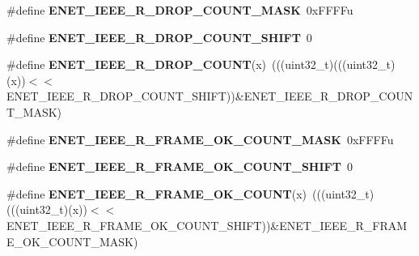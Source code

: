 \begin{DoxyCompactItemize}
\item 
\#define {\bfseries E\+N\+E\+T\+\_\+\+I\+E\+E\+E\+\_\+\+R\+\_\+\+D\+R\+O\+P\+\_\+\+C\+O\+U\+N\+T\+\_\+\+M\+A\+SK}~0x\+F\+F\+F\+Fu\hypertarget{group__ENET__Register__Masks_ga40514ce83587f1cd466ecbe7b007e571}{}\label{group__ENET__Register__Masks_ga40514ce83587f1cd466ecbe7b007e571}

\item 
\#define {\bfseries E\+N\+E\+T\+\_\+\+I\+E\+E\+E\+\_\+\+R\+\_\+\+D\+R\+O\+P\+\_\+\+C\+O\+U\+N\+T\+\_\+\+S\+H\+I\+FT}~0\hypertarget{group__ENET__Register__Masks_gadfe517b4bb1358a8934a04c3bfe94d9d}{}\label{group__ENET__Register__Masks_gadfe517b4bb1358a8934a04c3bfe94d9d}

\item 
\#define {\bfseries E\+N\+E\+T\+\_\+\+I\+E\+E\+E\+\_\+\+R\+\_\+\+D\+R\+O\+P\+\_\+\+C\+O\+U\+NT}(x)~(((uint32\+\_\+t)(((uint32\+\_\+t)(x))$<$$<$E\+N\+E\+T\+\_\+\+I\+E\+E\+E\+\_\+\+R\+\_\+\+D\+R\+O\+P\+\_\+\+C\+O\+U\+N\+T\+\_\+\+S\+H\+I\+FT))\&E\+N\+E\+T\+\_\+\+I\+E\+E\+E\+\_\+\+R\+\_\+\+D\+R\+O\+P\+\_\+\+C\+O\+U\+N\+T\+\_\+\+M\+A\+SK)\hypertarget{group__ENET__Register__Masks_ga949d161e892827ef0d58e6dc6597885b}{}\label{group__ENET__Register__Masks_ga949d161e892827ef0d58e6dc6597885b}

\item 
\#define {\bfseries E\+N\+E\+T\+\_\+\+I\+E\+E\+E\+\_\+\+R\+\_\+\+F\+R\+A\+M\+E\+\_\+\+O\+K\+\_\+\+C\+O\+U\+N\+T\+\_\+\+M\+A\+SK}~0x\+F\+F\+F\+Fu\hypertarget{group__ENET__Register__Masks_ga61cc0d2a38667a1263e2233c7f9a4270}{}\label{group__ENET__Register__Masks_ga61cc0d2a38667a1263e2233c7f9a4270}

\item 
\#define {\bfseries E\+N\+E\+T\+\_\+\+I\+E\+E\+E\+\_\+\+R\+\_\+\+F\+R\+A\+M\+E\+\_\+\+O\+K\+\_\+\+C\+O\+U\+N\+T\+\_\+\+S\+H\+I\+FT}~0\hypertarget{group__ENET__Register__Masks_ga18b9d145aab58ab10347846c95e949a3}{}\label{group__ENET__Register__Masks_ga18b9d145aab58ab10347846c95e949a3}

\item 
\#define {\bfseries E\+N\+E\+T\+\_\+\+I\+E\+E\+E\+\_\+\+R\+\_\+\+F\+R\+A\+M\+E\+\_\+\+O\+K\+\_\+\+C\+O\+U\+NT}(x)~(((uint32\+\_\+t)(((uint32\+\_\+t)(x))$<$$<$E\+N\+E\+T\+\_\+\+I\+E\+E\+E\+\_\+\+R\+\_\+\+F\+R\+A\+M\+E\+\_\+\+O\+K\+\_\+\+C\+O\+U\+N\+T\+\_\+\+S\+H\+I\+FT))\&E\+N\+E\+T\+\_\+\+I\+E\+E\+E\+\_\+\+R\+\_\+\+F\+R\+A\+M\+E\+\_\+\+O\+K\+\_\+\+C\+O\+U\+N\+T\+\_\+\+M\+A\+SK)\hypertarget{group__ENET__Register__Masks_gaad53aabe1c637f933cde5311c9042ac7}{}\label{group__ENET__Register__Masks_gaad53aabe1c637f933cde5311c9042ac7}


\end{DoxyCompactItemize}
